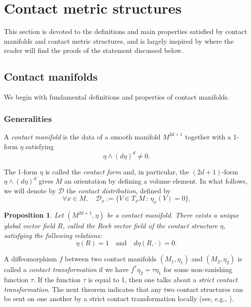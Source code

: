 \documentclass[12pt,a4paper]{amsart}
\theoremstyle{plain}
\newtheorem{proposition}[theorem]{Proposition}
\theoremstyle{definition}
\theoremstyle{remark}
\numberwithin{equation}{section}
\theoremstyle{definition}
\def \cD{\mathcal{D}}
\numberwithin{equation}{section}
\begin{document}
\section{Contact metric structures}
\label{sect:contactmanifolds}

This section is devoted to the definitions and main properties satisfied by contact manifolds and contact metric structures, and is largely inspired by \cite{Blair} where the reader will find the proofs of the statement discussed below.

\subsection{Contact manifolds} 

We begin with fundamental definitions and properties of contact manifolds.

\subsubsection{Generalities}
\label{subsubsect:generalitiescontact}

A \emph{contact manifold} is the data of a smooth manifold $M^{2d+1}$ together with a 1-form $\eta$ satisfying
\begin{equation*}
    \eta \wedge (d \eta)^d \neq 0.
\end{equation*}

The 1-form $\eta$ is called the \emph{contact form} and, in particular, the $(2d+1)$-form $\eta \wedge (d \eta)^d$ gives $M$ an orientation by defining a volume element. 
In what follows, we will denote by $\cD$ the \emph{contact distribution}, defined by 
\begin{equation*}
 \forall x\in M,\quad \cD_x := \{V \in T_x M\,:\,\eta_x(V)=0\}.
\end{equation*}

\begin{proposition}
 Let $(M^{2d+1},\eta)$ be a contact manifold. There exists a unique global vector field $R$, called the \emph{Reeb vector field}
 of the contact structure $\eta$, satisfying the following relations:
 \begin{equation*}
 \eta(R) = 1\quad\mbox{and}\quad d\eta(R,\cdot) = 0.
 \end{equation*}
\end{proposition}

A diffeomorphism $f$ between two contact manifolds $(M_1,\eta_1)$ and $(M_2,\eta_2)$ is called a \emph{contact transformation} if we have 
$f^* \eta_2 = \tau \eta_1$ for some non-vanishing function $\tau$. If the function $\tau$ is equal to 1, then one talks about a \emph{strict contact transformation}.
The next theorem indicates that any two contact structures can be sent on one another by a strict contact transformation locally (see, e.g., \cite[Section 6.2]{Mo02}).
\end{document}
